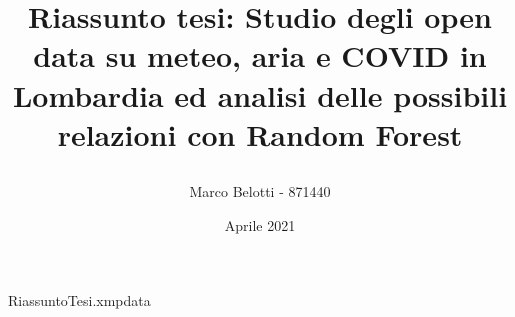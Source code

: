 \begin{filecontents*}{RiassuntoTesi.xmpdata}
\end{filecontents*}

\documentclass[a4paper]{article}

\usepackage[utf8]{inputenc}
\usepackage[english,italian]{babel}
\usepackage[hyphens]{url}


\title{Riassunto tesi: Studio degli open data su meteo, aria e COVID in Lombardia ed analisi delle possibili relazioni con Random Forest\author{Marco Belotti - 871440}\date{Aprile 2021}}


\maketitle

\section{Ente presso cui è stato svolto il lavoro di stage}
Lo stage si è svolto internamente all'Università degli Studi di Milano, con il professore Andrea Trentini.

\section{Contesto iniziale}
L'inquinamento atmosferico è sicuramente un tema molto importante e discusso all'interno della comunità scientifica, il suo impatto sulla saluta umana e sull'ambiente è noto e diverse nel corso degli anni sono state le misure introdotte per regolamentare le fonti emissive e provare a contenere il problema, specie laddove la situazione risultava maggiormente critica.  

Nel corso degli ultimi 20 anni, grazie ad una serie di normative ed al progresso tecnologico che ha coinvolto tutti i settori, le concentrazioni di tutti gli inquinanti più preoccupanti come il biossido di azoto, il biossido di zolfo, il monossido di carbonio, il benzene e le polveri sottili (PM10 e PM2.5) sono calate con percentuali tra il 10\% ed il 90\%, ma per alcuni di essi, biossido di azoto e polveri sottili, rimane una certa preoccupazione a causa della potenziale pericolosità sulla salute delle concentrazioni attuali \cite{iir2020}.


